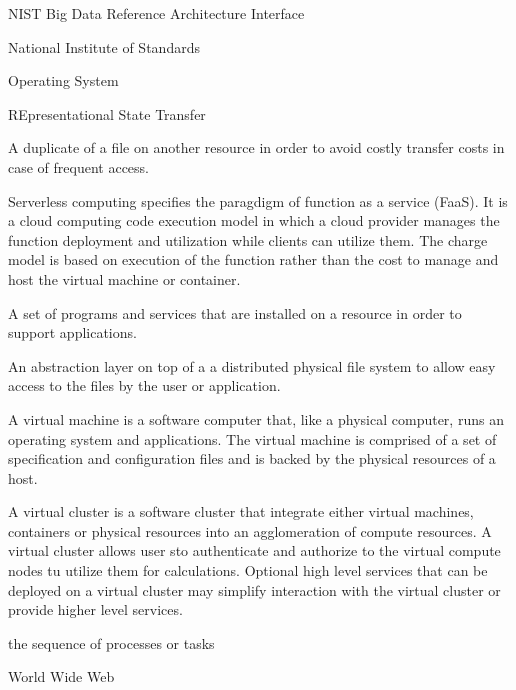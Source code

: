 \documentclass[10pt]{article}
\begin{document}
\begin{description}[leftmargin=8em,style=nextline]
\item[NBDRAI] 	       NIST Big Data Reference Architecture Interface

\item[NIST] 	       National Institute of Standards

\item[OS] 	       Operating System

\item[REST] 	       REpresentational State Transfer

\item[Replica] A duplicate of a file on another resource in
  order to avoid costly transfer costs in case of frequent access.

\item[Serverless Computing] Serverless computing specifies the
  paragdigm of function as a service (FaaS). It is a cloud computing
  code execution model in which a cloud provider manages the function
  deployment and utilization while clients can utilize them. The
  charge model is based on execution of the function rather than the
  cost to manage and host the virtual machine or container.

\item[Software Stack] A set of programs and services that are
  installed on a resource in order to support applications.

\item[Virtual Filesysyem] An abstraction layer on top of a 
  a distributed physical file system to allow easy access to the files
  by the user or application.

\item[Virtual Machine] A virtual machine is a software computer that,
  like a physical computer, runs an operating system and applications.
  The virtual machine is comprised of a set of specification and
  configuration files and is backed by the physical resources of a
  host.

\item[Virtual Cluster] A virtual cluster is a software cluster that
  integrate either virtual machines, containers or physical resources into an
  agglomeration of compute resources. A virtual cluster allows user
  sto authenticate and authorize to the virtual compute nodes tu
  utilize them for calculations. Optional high level services that can
  be deployed on a virtual cluster may simplify
  interaction with the virtual cluster or provide higher level
  services. 

\item[Workflow] the sequence of processes or tasks

\item[WWW] World Wide Web

\end{description}
 
\end{document}

